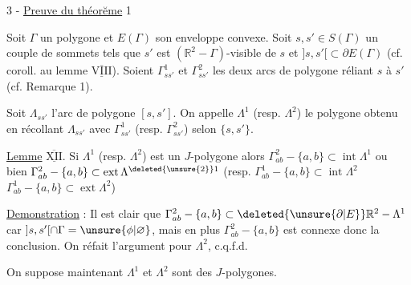 3 - \uline{Preuve du théorĕme} 1

\margin{!}Soit $\Gamma$ un polygone et $E(\Gamma)$ son enveloppe convexe. Soit $s,s'\in S(\Gamma)$ un couple de sommets  tels que $s'$ est $(\mathbb{R}^2-\Gamma)$-visible de $s$ et $]s,s'[\subset\partial E(\Gamma)$ (cf. coroll. au lemme $\underline{\overline{\mathrm{VIII}}}$). Soient $\Gamma^1_{ss'}$ et $\Gamma^2_{ss'}$ les deux arcs de polygone  réliant $s$ à $s'$ (cf. Remarque 1).

Soit $\Lambda_{ss'}$ l'arc de polygone $[s,s']$. On appelle $\Lambda^1$ (resp. $\Lambda^2$) le polygone obtenu en récollant $\Lambda_{ss'}$ avec $\Gamma^1_{ss'}$ (resp. $\Gamma^2_{ss'}$) selon $\{s,s'\}$.

\uline{Lemme} $\underline{\overline{\mathrm{XII}}}$. Si $\Lambda^1$ (resp. $\Lambda^2$) est un $J$-polygone alors $\Gamma^2_{ab}-\{a,b\}\subset\operatorname{int}\Lambda^1$ ou bien $\Gamma^2_{ab}-\{a,b\}\subset\operatorname{ext}\Lambda^{\deleted{\unsure{2}}1}$ (resp. $\Gamma^1_{ab}-\{a,b\}\subset\operatorname{int}\Lambda^2$ $\Gamma^1_{ab}-\{a,b\}\subset\operatorname{ext}\Lambda^2$)

\uline{Demonstration} : Il est clair que $\Gamma^2_{ab}-\{a,b\}\subset\deleted{\unsure{\partial|E}}\mathbb{R}^2-\Lambda^1$ car $]s,s'[\cap\Gamma=\unsure{\phi|\varnothing}$, mais en plus $\Gamma^2_{ab}-\{a,b\}$ est connexe donc la conclusion. On réfait l'argument pour $\Lambda^2$, c.q.f.d.

On suppose maintenant  $\Lambda^1$ et $\Lambda^2$  sont des $J$-polygones.

